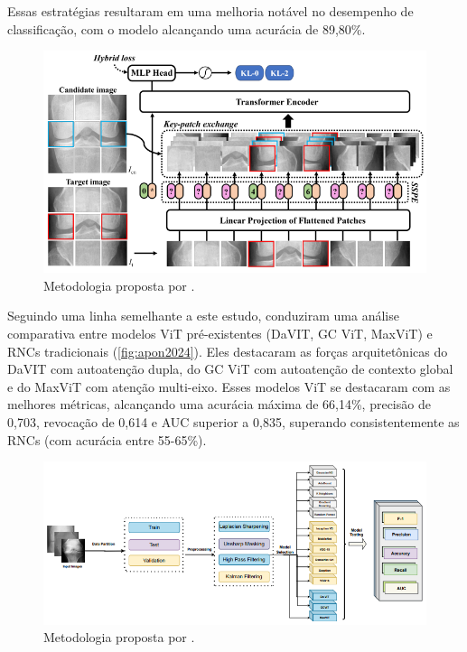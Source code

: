 Essas estratégias resultaram em uma melhoria notável no desempenho de classificação, com o modelo alcançando uma acurácia de 89,80\%.

\begin{figure}[h]
    \centering
    \includegraphics[width=\textwidth]{figs/wang2024.png}
    \caption{Metodologia proposta por \cite{Wang_2024}.}
    \label{fig:wang2024}
\end{figure}

Seguindo uma linha semelhante a este estudo, \cite{apon2024} conduziram uma análise comparativa entre modelos ViT pré-existentes (DaVIT, GC ViT, MaxViT) e RNCs tradicionais (\autoref{fig:apon2024}). Eles destacaram as forças arquitetônicas do DaVIT com autoatenção dupla, do GC ViT com autoatenção de contexto global e do MaxViT com atenção multi-eixo. Esses modelos ViT se destacaram com as melhores métricas, alcançando uma acurácia máxima de 66,14\%, precisão de 0,703, revocação de 0,614 e AUC superior a 0,835, superando consistentemente as RNCs (com acurácia entre 55-65\%).

\begin{figure}[h]
    \centering
    \includegraphics[width=\textwidth]{figs/apon2024.png}
    \caption{Metodologia proposta por \cite{apon2024}.}
    \label{fig:apon2024}
\end{figure}